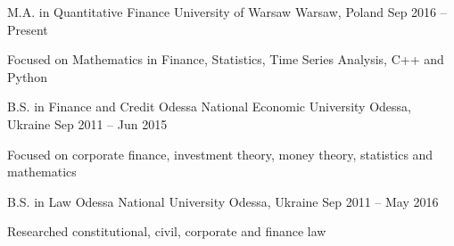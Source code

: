 \begin{cventries}
  \cventry
    {M.A. in Quantitative Finance}
    {University of Warsaw}
    {Warsaw, Poland}
    {Sep 2016 – Present}
    {
      \begin{cvitems}
        \item {Focused on Mathematics in Finance, Statistics, Time Series Analysis, C++ and Python}
      \end{cvitems}
    }
  \cventry
    {B.S. in Finance and Credit}
    {Odessa National Economic University}
    {Odessa, Ukraine}
    {Sep 2011 – Jun 2015}
    {
      \begin{cvitems}
        \item {Focused on corporate finance, investment theory, money theory, statistics and mathematics}
      \end{cvitems}
    }
  \cventry
    {B.S. in Law}
    {Odessa National University}
    {Odessa, Ukraine}
    {Sep 2011 – May 2016}
    {
      \begin{cvitems}
        \item {Researched constitutional, civil, corporate and finance law}
      \end{cvitems}
    }

\end{cventries}
